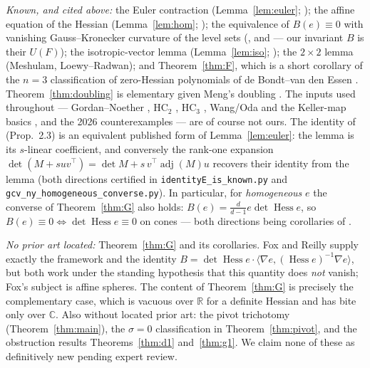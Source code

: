 \documentclass[11pt]{article}
\theoremstyle{plain}
\theoremstyle{definition}
\newcommand{\C}{\mathbb{C}}
\newcommand{\Hess}{\operatorname{Hess}}
\newcommand{\adj}{\operatorname{adj}}
\newcommand{\HC}{\mathrm{HC}}
\newcommand{\rea}{\mathbb{R}}
\begin{document}
\emph{Known, and cited above:} the Euler contraction
(Lemma~\ref{lem:euler}; \cite{Fox2017,DHWZ,Dolgachev}); the affine
equation of the Hessian (Lemma~\ref{lem:hom}; \cite{Dolgachev}); the
equivalence of $B(e)\equiv0$ with vanishing Gauss--Kronecker curvature of
the level sets (\cite{Reilly}, and \cite{Fox2017} --- our invariant $B$ is
their $U(F)$); the isotropic-vector lemma (Lemma~\ref{lem:iso};
\cite{Gow,FLR,Landsberg}); the $2\times2$ lemma (Meshulam,
Loewy--Radwan); and Theorem~\ref{thm:F}, which is a short corollary of the
$n=3$ classification of zero-Hessian polynomials of de Bondt--van den
Essen \cite{dBvdESingular}. Theorem~\ref{thm:doubling} is elementary given
Meng's doubling \cite{Meng2006}. The inputs used throughout ---
Gordan--Noether \cite{WdB}, $\HC_2$ \cite{Dillen}, $\HC_3$
\cite{deBondt2015}, Wang/Oda and the Keller-map basics \cite{BCW}, and the
2026 counterexamples \cite{MengYang,Gao} --- are of course not ours. The
identity of \cite{NY} (Prop.~2.3) is an equivalent published form of
Lemma~\ref{lem:euler}: the lemma is its $s$-linear coefficient, and
conversely the rank-one expansion
$\det(M+suv^\top)=\det M+s\,v^\top\adj(M)u$ recovers their identity from the
lemma (both directions certified in \texttt{identityE\_is\_known.py} and
\texttt{gcv\_ny\_homogeneous\_converse.py}). In particular, for
\emph{homogeneous} $e$ the converse of Theorem~\ref{thm:G} also holds:
$B(e)=\tfrac{d}{d-1}e\det\Hess e$, so $B(e)\equiv0\iff\det\Hess e\equiv0$ on
cones --- both directions being corollaries of \cite{NY}.

\emph{No prior art located:} Theorem~\ref{thm:G} and its corollaries. Fox
and Reilly supply exactly the framework and the identity
$B=\det\Hess e\cdot\langle\nabla e,(\Hess e)^{-1}\nabla e\rangle$, but both
work under the standing hypothesis that this quantity does \emph{not}
vanish; Fox's subject is affine spheres. The content of
Theorem~\ref{thm:G} is precisely the complementary case, which is vacuous
over $\rea$ for a definite Hessian and has bite only over $\C$. Also
without located prior art: the pivot trichotomy
(Theorem~\ref{thm:main}), the $\sigma=0$ classification in
Theorem~\ref{thm:pivot}, and the obstruction results
Theorems~\ref{thm:d1} and~\ref{thm:g1}. We claim none of these as
definitively new pending expert review.
\end{document}
